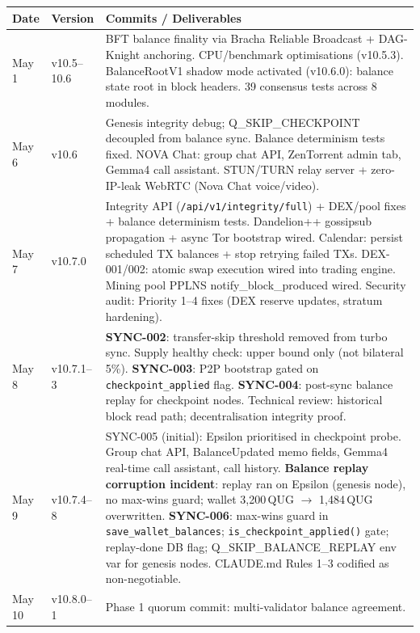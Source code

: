 \documentclass[12pt,a4paper]{article}
\begin{document}
\begin{table}[H]
\centering
\small
\renewcommand{\arraystretch}{1.28}
\begin{tabularx}{\linewidth}{@{}l l X@{}}
\toprule
\textbf{Date} & \textbf{Version} & \textbf{Commits / Deliverables} \\
\midrule
May 1 & v10.5--10.6 &
  BFT balance finality via Bracha Reliable Broadcast + DAG-Knight anchoring.
  CPU/benchmark optimisations (v10.5.3).
  BalanceRootV1 shadow mode activated (v10.6.0): balance state root in block headers.
  39 consensus tests across 8 modules. \\
\rowcolor{qblue!10}
May 6 & v10.6 &
  Genesis integrity debug; Q\_SKIP\_CHECKPOINT decoupled from balance sync.
  Balance determinism tests fixed.
  NOVA Chat: group chat API, ZenTorrent admin tab, Gemma4 call assistant.
  STUN/TURN relay server + zero-IP-leak WebRTC (Nova Chat voice/video). \\
May 7 & v10.7.0 &
  Integrity API (\texttt{/api/v1/integrity/full}) + DEX/pool fixes + balance determinism tests.
  Dandelion++ gossipsub propagation + async Tor bootstrap wired.
  Calendar: persist scheduled TX balances + stop retrying failed TXs.
  DEX-001/002: atomic swap execution wired into trading engine.
  Mining pool PPLNS notify\_block\_produced wired.
  Security audit: Priority 1--4 fixes (DEX reserve updates, stratum hardening). \\
\rowcolor{qblue!10}
May 8 & v10.7.1--3 &
  \textbf{SYNC-002}: transfer-skip threshold removed from turbo sync.
  Supply healthy check: upper bound only (not bilateral 5\%).
  \textbf{SYNC-003}: P2P bootstrap gated on \texttt{checkpoint\_applied} flag.
  \textbf{SYNC-004}: post-sync balance replay for checkpoint nodes.
  Technical review: historical block read path; decentralisation integrity proof. \\
May 9 & v10.7.4--8 &
  SYNC-005 (initial): Epsilon prioritised in checkpoint probe.
  Group chat API, BalanceUpdated memo fields, Gemma4 real-time call assistant, call history.
  \textbf{Balance replay corruption incident}:
    replay ran on Epsilon (genesis node), no max-wins guard;
    wallet 3,200\,QUG $\to$ 1,484\,QUG overwritten.
  \textbf{SYNC-006}: max-wins guard in \texttt{save\_wallet\_balances};
    \texttt{is\_checkpoint\_applied()} gate; replay-done DB flag;
    Q\_SKIP\_BALANCE\_REPLAY env var for genesis nodes.
  CLAUDE.md Rules 1--3 codified as non-negotiable. \\
\rowcolor{qblue!10}
May 10 & v10.8.0--1 &
  Phase 1 quorum commit: multi-validator balance agreement.

\end{tabularx}
\end{table}
\end{document}
